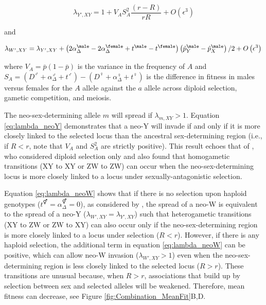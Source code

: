 \documentclass[12pt]{article}
\begin{document}
\begin{equation}
\lambda_{Y',XY} =1+ V_{A}S_{A}^2\frac{ \left( r-R \right) }{r R}+O\left(\epsilon^3 \right) 
\label{eq:lambda_neoY}
\end{equation}

\noindent 
and 

\begin{equation}
\lambda_{W',XY} =\lambda_{Y',XY}+\left(2\alpha_{\Delta}^\male-2\alpha_{\Delta}^\female+t^\male-t^\female \right) \left( \hat{p}^\male_Y-\hat{p}^\male_X \right)/2
+O\left(\epsilon^3 \right) \\
\label{eq:lambda_neoW}
\end{equation}

\noindent
where $V_{A}=\bar{p}(1-\bar{p})$ is the variance in the frequency of $A$ and $S_{A}=(D^\male +\alpha_{\Delta}^\male+t^\male) - (D^\female+\alpha_{\Delta}^\female+t^\female)$ is the difference in fitness in males versus females for the $A$ allele against the $a$ allele across diploid selection, gametic competition, and meiosis. 

The neo-sex-determining allele $m$ will spread if $\lambda_{m,XY}>1$. 
Equation \eqref{eq:lambda_neoY} demonstrates that a neo-Y will invade if and only if it is more closely linked to the selected locus than the ancestral sex-determining region (i.e., if $R<r$, note that $V_{A}$ and $S_{A}^2$ are strictly positive). 
This result echoes that of \citet{vanDoorn:2007eu}, who considered diploid selection only and also found that homogametic transitions (XY to XY or ZW to ZW) can occur when the neo-sex-determining locus is more closely linked to a locus under sexually-antagonistic selection. 

Equation \eqref{eq:lambda_neoW} shows that if there is no selection upon haploid genotypes ($t^\Hermaphrodite=\alpha^\Hermaphrodite_{\Delta}=0$), as considered by \citet{vanDoorn:2010hu}, the spread of a neo-W is equivalent to the spread of a neo-Y ($\lambda_{W',XY}=\lambda_{Y',XY}$) such that heterogametic transitions (XY to ZW or ZW to XY) can also occur only if the neo-sex-determining region is more closely linked to a locus under selection ($R<r$). 
However, if there is any haploid selection, the additional term in equation \eqref{eq:lambda_neoW} can be positive, which can allow neo-W invasion ($\lambda_{W',XY}>1$) even when the neo-sex-determining region is less closely linked to the selected locus ($R>r$). 
These transitions are unusual because, when $R>r$, associations that build up by selection between sex and selected alleles will be weakened. 
Therefore, mean fitness can decrease, see Figure \ref{fig:Combination_MeanFit}B,D. 
\end{document}
